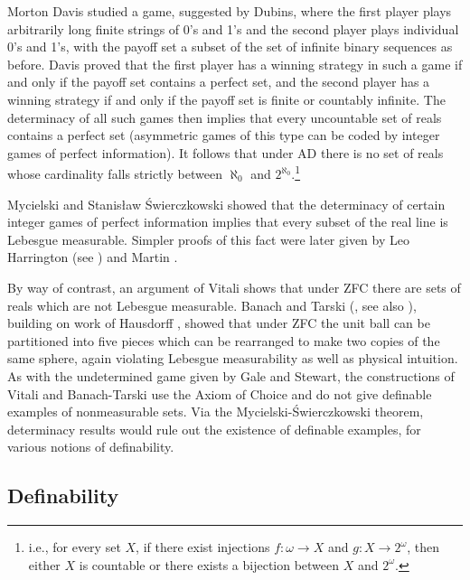 \documentclass{book}%
\begin{document}
Morton Davis  studied a game, suggested by Dubins, where
the first player plays arbitrarily long finite strings of 0's and
1's and the second player plays individual 0's and 1's, with the
payoff set a subset of the set of infinite binary sequences as
before. Davis proved that the first player has a
winning strategy in such a game if and only if the payoff set
contains a perfect set,
and the second player has a winning strategy if and only if the payoff set is
finite or countably infinite. The determinacy of all such games then
implies that every uncountable set of reals contains a perfect set
(asymmetric games of this type can be coded by integer
games of perfect information). It follows that under AD
there is no set of reals whose cardinality falls strictly between
$\aleph_0$ and $2^{\boldsymbol\aleph_0}$.\footnote{i.e., for every
set $X$, if there exist injections $f \colon \omega \to X$ and $g
\colon X \to 2^{\omega}$, then either $X$ is countable or there
exists a bijection between $X$ and $2^{\omega}$.}

Mycielski and Stanis{\l}aw \'{S}wierczkowski  showed
that the determinacy of certain integer games of perfect information
implies that every subset of the real line is Lebesgue measurable. Simpler proofs of this fact
were later given by Leo Harrington (see \cite[pp.~375-377]{Kanamori})
and Martin .

By way of contrast, an argument of Vitali  shows that under ZFC there are sets of reals
which are not Lebesgue measurable. Banach and Tarski (, see also
\cite{Wagon:BTP}), building on work of Hausdorff , showed that under ZFC the unit ball can be partitioned into five pieces
which can be rearranged to make two copies of the same sphere, again violating Lebesgue measurability as well as physical
intuition. As with the undetermined game given by Gale and Stewart, the constructions of Vitali and Banach-Tarski
use the Axiom of Choice and do not give definable examples of nonmeasurable sets. Via the Mycielski-\'{S}wierczkowski theorem,
determinacy results would rule out the existence of definable examples, for various notions of definability.


\subsection{Definability}\label{defsec}
\end{document}
